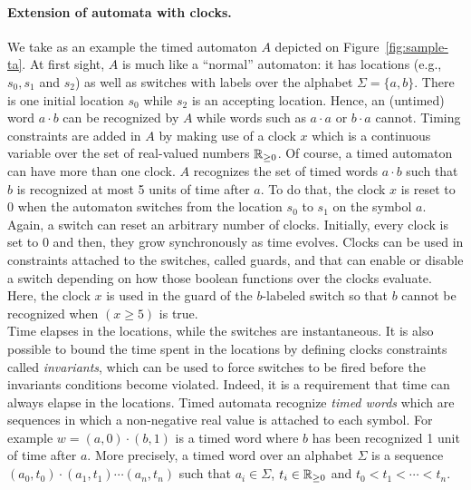 \paragraph{Extension of automata with clocks.}
We take as an example the timed automaton $A$ depicted on Figure~\ref{fig:sample-ta}. At first sight, $A$ is much like a ``normal'' automaton: it has locations (e.g., $s_0, s_1$ and $s_2$) as well as switches with labels over the alphabet $\Sigma = \{ a, b \}$. There is one initial location $s_0$ while $s_2$ is an accepting location. Hence, an (untimed) word $a \cdot b$ can be recognized by $A$ while words such as $a \cdot a$ or $b \cdot a$ cannot. Timing constraints are added in $A$ by making use of a clock $x$ which is a continuous variable over the set of real-valued numbers $\mathbb{R}_{\geq 0}$. Of course, a timed automaton can have more than one clock. $A$ recognizes the set of timed words $a \cdot b$ such that $b$ is recognized at most 5 units of time after $a$. To do that, the clock $x$ is reset to $0$ when the automaton switches from the location $s_0$ to $s_1$ on the symbol $a$. Again, a switch can reset an arbitrary number of clocks. Initially, every clock is set to $0$ and then, they grow synchronously as time evolves. Clocks can be used in constraints attached to the switches, called guards, and that can enable or disable a switch depending on how those boolean functions over the clocks evaluate. Here, the clock $x$ is used in the guard of the $b$-labeled switch so that $b$ cannot be recognized when $(x \geq 5)$ is true.\\

Time elapses in the locations, while the switches are instantaneous. It is also possible to bound the time spent in the locations by defining clocks constraints called \emph{invariants}, which can be used to force switches to be fired before the invariants conditions become violated. Indeed, it is a requirement that time can always elapse in the locations. Timed automata recognize \emph{timed words} which are sequences in which a non-negative real value is attached to each symbol. For example $w = (a, 0) \cdot (b, 1)$ is a timed word where $b$ has been recognized 1 unit of time after $a$. More precisely, a timed word over an alphabet $\Sigma$ is a sequence $(a_0,t_0) \cdot (a_1, t_1) \cdots (a_n, t_n)$ such that $a_i \in \Sigma$,  $t_i \in \mathbb{R}_{\geq 0}$ and  $t_0 < t_1 < \cdots < t_n$.

